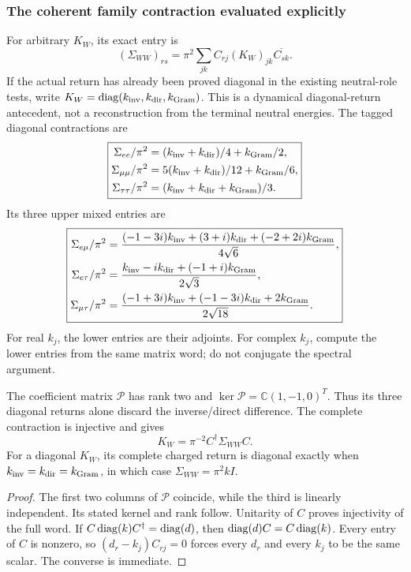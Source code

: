 \documentclass[12pt,a4paper]{article}
\begin{document}
\subsubsection{The coherent family contraction evaluated explicitly}
For arbitrary $K_W$, its exact entry is
\[
 (\Sigma_{WW})_{rs}=\pi^2\sum_{jk}C_{rj}(K_W)_{jk}\overline{C_{sk}}.
\]
If the actual return has already been proved diagonal in the existing
neutral-role tests, write
$K_W=\operatorname{diag}(k_{\rm inv},k_{\rm dir},k_{\rm Gram})$.
This is a dynamical diagonal-return antecedent, not a reconstruction from
the terminal neutral energies. The tagged diagonal contractions are
\[
 \boxed{
 \begin{aligned}
 \Sigma_{ee}/\pi^2&=(k_{\rm inv}+k_{\rm dir})/4+k_{\rm Gram}/2,\\
 \Sigma_{\mu\mu}/\pi^2&=5(k_{\rm inv}+k_{\rm dir})/12+k_{\rm Gram}/6,\\
 \Sigma_{\tau\tau}/\pi^2&=(k_{\rm inv}+k_{\rm dir}+k_{\rm Gram})/3.
 \end{aligned}}
\]
Its three upper mixed entries are
\[
 \boxed{
 \begin{aligned}
 \Sigma_{e\mu}/\pi^2
 &=\frac{(-1-3i)k_{\rm inv}+(3+i)k_{\rm dir}+(-2+2i)k_{\rm Gram}}
          {4\sqrt6},\\
 \Sigma_{e\tau}/\pi^2
 &=\frac{k_{\rm inv}-ik_{\rm dir}+(-1+i)k_{\rm Gram}}{2\sqrt3},\\
 \Sigma_{\mu\tau}/\pi^2
 &=\frac{(-1+3i)k_{\rm inv}+(-1-3i)k_{\rm dir}+2k_{\rm Gram}}
          {2\sqrt{18}}.
 \end{aligned}}
\]
For real $k_j$, the lower entries are their adjoints. For complex $k_j$,
compute the lower entries from the same matrix word; do not conjugate the
spectral argument.

\begin{proposition}
\label{p5c:prop:v2168-coherent-family-return}
The coefficient matrix $\mathcal P$ has rank two and
$\ker\mathcal P=\mathbb C(1,-1,0)^T$. Thus its three diagonal returns alone
discard the inverse/direct difference. The complete contraction is
injective and gives
\[
 K_W=\pi^{-2}C^\dagger\Sigma_{WW}C.
\]
For a diagonal $K_W$, its complete charged return is diagonal exactly when
$k_{\rm inv}=k_{\rm dir}=k_{\rm Gram}$, in which case
$\Sigma_{WW}=\pi^2kI$.
\end{proposition}
\begin{proof}
The first two columns of $\mathcal P$ coincide, while the third is linearly
independent. Its stated kernel and rank follow. Unitarity of $C$ proves
injectivity of the full word. If $C\operatorname{diag}(k)C^\dagger=\operatorname{diag}(d)$, then
$\operatorname{diag}(d)C=C\operatorname{diag}(k)$. Every entry of $C$ is nonzero, so
$(d_r-k_j)C_{rj}=0$ forces every $d_r$ and every $k_j$ to be the same
scalar. The converse is immediate.
\end{proof}
\end{document}
